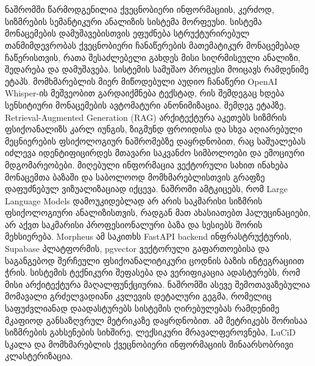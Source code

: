 \documentclass[12pt,a4paper]{report}
\begin{document}
\chapter*{}
\begin{georgian}
ნაშრომში წარმოდგენილია ქვეცნობიერი ინფორმაციის, კერძოდ, სიზმრების სემანტიკური ანალიზის სისტემა მორფეუსი. სისტემა მონაცემების დამუშავებისთვის ეფუძნება სტრუქტურირებულ თანმიმდევრობას ქვეცნობიერი ჩანაწერების მათემატიკურ მონაცემებად ჩაწერისთვის, რათა შესაძლებელი გახდეს მისი სიღრმისეული ანალიზი, შედარება და დამუშავება. სისტემის სამუშაო პროცესი მოიცავს რამდენიმე ეტაპს. მომხმარებლის მიერ მიწოდებული აუდიო ჩანაწერი OpenAI Whisper-ის მეშვეობით გარდაიქმნება ტექსტად, რის შემდეგაც ხდება სენსიტიური მონაცემების ავტომატური ანონიმიზაცია. შემდეგ ეტაპზე, Retrieval-Augmented Generation (RAG) არქიტექტურა აკეთებს სიზმრის ფსიქოანალიზს კარლ იუნგის, ზიგმუნდ ფროიდისა და სხვა აღიარებული მეცნიერების ფსიქოლოგიურ ნაშრომებზე დაყრდნობით, რაც საშუალებას იძლევა იდენტიფიცირდეს მთავარი საკვანძო სიმბოლოები და ემოციური მდგომარეობები. მიღებული ინფორმაცია ვექტორული სახით ინახება მონაცემთა ბაზაში და საბოლოოდ მომხმარებლისთვის გრაფზე დაფუძნებულ ვიზუალიზაციად იქცევა. ნაშრომი ამტკიცებს, რომ Large Language Models დამოუკიდებლად არ არის საკმარისი სიზმრის ფსიქოლოგიური ანალიზისთვის, რადგან მათ ახასიათებთ ჰალუცინაციები, არ აქვთ საკმარისი პროფესიონალური ბაზა და სესიებს შორის მეხსიერება. Morpheus ამ საკითხს FastAPI backend ინფრასტრუქტურის, Supabase პლატფორმის, pgvector ვექტორული გაფართოებისა და საგანგებოდ შერჩეული ფსიქოანალიტიკური ცოდნის ბაზის ინტეგრაციით ჭრის. სისტემის ტექნიკური შეფასება და ვერიფიკაცია ადასტურებს, რომ მისი არქიტექტურა მაღალფუნქციურია. ნაშრომში ასევე შემოთავაზებულია მომავალი გრძელვადიანი კვლევის დეტალური გეგმა, რომელიც საფუძვლიანად დაადასტურებს სისტემის ღირებულებას რამდენიმე მკაფიოდ განსაზღვრულ მეტრიკაზე დაყრდნობით. ამ მეტრიკებს შორისაა სიზმრების გახსენების სიხშირე, ლექსიკური მრავალფეროვნება, LuCiD სკალა და მომხმარებლის ქვეცნობიერი ინფორმაციის შინაარსობრივი კლასტერიზაცია.
\end{georgian}
\clearpage
{}
\end{document}
